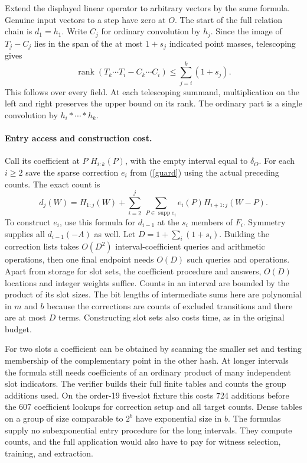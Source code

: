 \documentclass[11pt]{article}
\begin{document}
Extend the displayed linear operator to arbitrary vectors by the same
formula. Genuine input vectors to a step have zero at $O$. The start
of the full relation chain is $d_1=h_1$. Write $C_j$ for ordinary
convolution by $h_j$. Since the image of $T_j-C_j$ lies in the span
of the at most $1+s_j$ indicated point masses, telescoping gives
\[
 \operatorname{rank}(T_k\cdots T_i-C_k\cdots C_i)
 \le \sum_{j=i}^k(1+s_j).
\]
This follows over every field. At each telescoping summand, multiplication
on the left and right preserves the upper bound on its rank.
The ordinary part is a single convolution by $h_i*\cdots*h_k$.

\paragraph{Entry access and construction cost.}
Call its coefficient at $P$ $H_{i:k}(P)$, with the empty interval
equal to $\delta_O$. For each $i\ge2$ save the sparse correction $e_i$
from (\ref{guard}) using the actual preceding counts. The exact count is
\[
 d_j(W)=H_{1:j}(W)+
 \sum_{i=2}^j\ \sum_{P\in\operatorname{supp} e_i}
       e_i(P)H_{i+1:j}(W-P).
\]
To construct $e_i$, use this formula for $d_{i-1}$ at the $s_i$
members of $F_i$. Symmetry supplies all $d_{i-1}(-A)$ as well.
Let $D=1+\sum_i(1+s_i)$. Building the correction lists takes $O(D^2)$
interval-coefficient queries and arithmetic operations, then one final
endpoint needs $O(D)$ such queries and operations. Apart from storage
for slot sets, the coefficient procedure and answers, $O(D)$ locations
and integer weights suffice. Counts in an interval are bounded by the
product of its slot sizes. The bit lengths of intermediate sums here
are polynomial in $m$ and $b$ because the corrections are counts of
excluded transitions and there are at most $D$ terms.
Constructing slot sets also costs time, as in the original budget.

For two slots a coefficient can be obtained by scanning the smaller
set and testing membership of the complementary point in the other
hash. At longer intervals the formula still needs coefficients of an
ordinary product of many independent slot indicators. The verifier
builds their full finite tables and counts the group additions used.
On the order-19 five-slot fixture this costs 724 additions before the
607 coefficient lookups for correction setup and all target counts.
Dense tables on a group of size comparable to $2^b$ have exponential
size in $b$. The formulas supply no subexponential entry procedure for
the long intervals. They compute counts, and the full application would
also have to pay for witness selection, training, and extraction.
\end{document}
